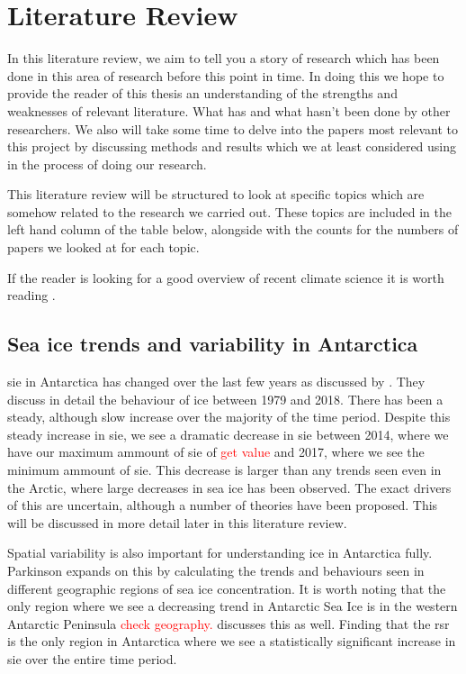 \documentclass[../main.tex]{subfiles}
\begin{document}
\chapter{Literature Review}
\label{chap:lit_review}
In this literature review, we aim to tell you a story of research which has been done in this area of research before this point in time. In doing this we hope to provide the reader of this thesis an understanding of the strengths and weaknesses of relevant literature. What has and what hasn't been done by other researchers. We also will take some time to delve into the papers most relevant to this project by discussing methods and results which we at least considered using in the process of doing our research.\medskip

This literature review will be structured to look at specific topics which are somehow related to the research we carried out. These topics are included in the left hand column of the table below, alongside with the counts for the numbers of papers we looked at for each topic.

If the reader is looking for a good overview of recent climate science it is worth reading \cite{doi:10.1175/2019BAMSStateoftheClimate.1}.


\section{Sea ice trends and variability in Antarctica}
\gls{sie} in Antarctica has changed over the last few years as discussed by \cite{Parkinson2019}. They discuss in detail the behaviour of ice between 1979 and 2018. There has been a steady, although slow increase over the majority of the time period. Despite this steady increase in \gls{sie}, we see a dramatic decrease in \gls{sie} between 2014, where we have our maximum ammount of \gls{sie} of \textcolor{red}{get value} and 2017, where we see the minimum ammount of \gls{sie}. This decrease is larger than any trends seen even in the Arctic, where large decreases in sea ice has been observed. The exact drivers of this are uncertain, although a number of theories have been proposed. This will be discussed in more detail later in this literature review.

Spatial variability is also important for understanding ice in Antarctica fully. Parkinson expands on this by calculating the trends and behaviours seen in different geographic regions of sea ice concentration. It is worth noting that the only region where we see a decreasing trend in Antarctic Sea Ice is in the western Antarctic Peninsula \textcolor{red}{check geography.} \cite{Yuan2018} discusses this as well. Finding that the \gls{rsr} is the only region in Antarctica where we see a statistically significant increase in \gls{sie} over the entire time period. 
\end{document}
